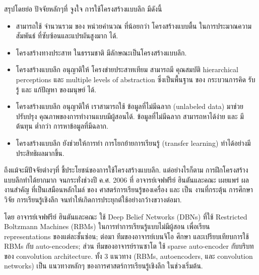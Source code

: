 สรุปโดยย่อ ปัจจัยหลักๆที่ จูงใจ การใช้โครงสร้างแบบลึก มีดังนี้
\begin{itemize}
\item สามารถใช้ จำนวนรวม ของ หน่วยคำนวณ ที่น้อยกว่า โครงสร้างแบบตื้น ในการประมาณความสัมพันธ์ ที่ซับซ้อนและแปรผันสูงมาก ได้.
\item โครงสร้างทางประสาท ในธรรมชาติ มีลักษณะเป็นโครงสร้างแบบลึก.
\item โครงสร้างแบบลึก อนุญาติให้ โครงข่ายประสาทเทียม สามารถมี คุณสมบัติ hierarchical perceptions และ multiple levels of abstraction ซึ่งเป็นพื้นฐาน ของ กระบวนการคิด รับรู้ และ แก้ปัญหา ของมนุษย์ ได้.
\item โครงสร้างแบบลึก อนุญาติให้ เราสามารถใช้ ข้อมูลที่ไม่มีฉลาก (unlabeled data) มาช่วยปรับปรุง คุณภาพของการทำงานแบบมีผู้สอนได้.
ข้อมูลที่ไม่มีฉลาก สามารถหาได้ง่าย และ มีต้นทุน ต่ำกว่า การหาข้อมูลที่มีฉลาก.
\item โครงสร้างแบบลึก ยังช่วยให้การทำ การโยกย้ายการเรียนรู้ (transfer learning) ทำได้อย่างมีประสิทธิผลมากขึ้น.
\end{itemize}

ถึงแม้จะมีปัจจัยต่างๆที่ ชี้ประโยชน์ของการใช้โครงสร้างแบบลึก.
แต่อย่างไรก็ตาม การฝึกโครงสร้างแบบลึกทำได้ยากมาก จนกระทั่งช่วงปี ค.ศ. 2006 ที่ อาจารย์เจฟฟรีย์ ฮินตันและคณะ \cite{HintonEtAl2006a} เผยแพร่ ผลงานสำคัญ ที่เป็นเสมือนหลักไมล์ ของ ศาสตร์การเรียนรู้ของเครื่อง และ เป็น งานที่กระตุ้น การศึกษาวิจัย การเรียนรู้เชิงลึก จนทำให้เกิดการประยุกต์ใช้อย่างกว้างขวางต่อมา.
%

โดย อาจารย์เจฟฟรีย์ ฮินตันและคณะ \cite{HintonEtAl2006a} ใช้ Deep Belief Networks (DBNs) ที่ใช้ Restricted Boltzmann Machines (RBMs) ในการทำการเรียนรู้แบบไม่มีผู้สอน เพื่อเรียน representations ของแต่ละชั้นซ่อน;
ต่อมา ทีมของอาจารย์เบนจิโอ \cite{BengioEtAl2007a} ศึกษา และเปรียบเทียบการใช้ RBMs กับ auto-encoders;
ส่วน ทีมของอาจารย์รานซาโต \cite{RanzatoEtAl2007a} ใช้ sparse auto-encoder กับบริบทของ convolution architecture.
ทั้ง 3 แนวทาง (RBMs, autoencoders, และ convolution networks) เป็น แนวทางหลักๆ ของการศาสตร์การเรียนรู้เชิงลึก ในช่วงเริ่มต้น.

